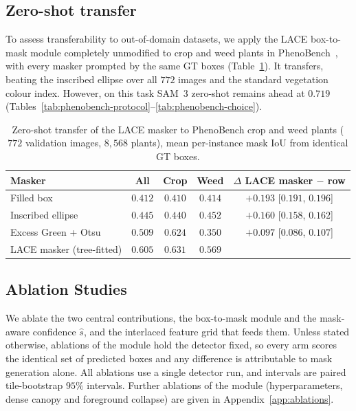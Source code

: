 \documentclass[remotesensing,article,submit,moreauthors]{Definitions/mdpi}
\begin{document}
\subsection{Zero-shot transfer}
\label{sec:phenobench}

To assess transferability to out-of-domain datasets, we apply the LACE box-to-mask module completely unmodified to crop and weed plants in PhenoBench~\cite{phenobench}, with every masker prompted by the same GT boxes (Table~\ref{tab:phenobench}). It transfers, beating the inscribed ellipse over all $772$ images and the standard vegetation colour index. However, on this task SAM~3 zero-shot remains ahead at $0.719$ (Tables~\ref{tab:phenobench-protocol}--\ref{tab:phenobench-choice}).

\begin{table}[H]
\caption{Zero-shot transfer of the LACE masker to PhenoBench crop and weed plants ($772$ validation images, $8{,}568$ plants), mean per-instance mask IoU from identical GT boxes.\label{tab:phenobench}}
\begin{tabularx}{\textwidth}{Xcccc}
\toprule
\textbf{Masker} & \textbf{All} & \textbf{Crop} & \textbf{Weed} & \textbf{$\Delta$ LACE masker $-$ row} \\
\midrule
Filled box & $0.412$ & $0.410$ & $0.414$ & $+0.193$ {\scriptsize [$0.191$, $0.196$]} \\
Inscribed ellipse & $0.445$ & $0.440$ & $0.452$ & $+0.160$ {\scriptsize [$0.158$, $0.162$]} \\
Excess Green + Otsu~\cite{woebbecke1995} & $0.509$ & $0.624$ & $0.350$ & $+0.097$ {\scriptsize [$0.086$, $0.107$]} \\
LACE masker (tree-fitted) & $\mathbf{0.605}$ & $\mathbf{0.631}$ & $\mathbf{0.569}$ & \\
\bottomrule
\end{tabularx}
\end{table}


\subsection{Ablation Studies}
\label{sec:ablation}

We ablate the two central contributions, the box-to-mask module and the mask-aware confidence $\hat s$, and the interlaced feature grid that feeds them. Unless stated otherwise, ablations of the module hold the detector fixed, so every arm scores the identical set of predicted boxes and any difference is attributable to mask generation alone. All ablations use a single detector run, and intervals are paired tile-bootstrap $95\%$ intervals. Further ablations of the module (hyperparameters, dense canopy and foreground collapse) are given in Appendix~\ref{app:ablations}.
\end{document}
